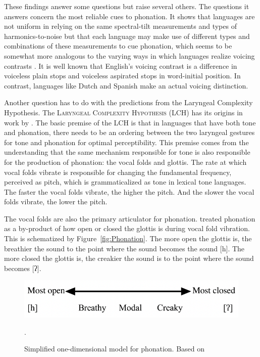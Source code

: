 \documentclass[12pt, letterpaper]{article}
\begin{document}
These findings answer some questions but raise several others. The questions it answers concern the most reliable cues to phonation. It shows that languages are not uniform in relying on the same spectral-tilt measurements and types of harmonics-to-noise but that each language may make use of different types and combinations of these measurements to cue phonation, which seems to be somewhat more analogous to the varying ways in which languages realize voicing contrasts \citep{liskerCrossLanguageStudyVoicing1964}. It is well known that English's voicing contrast is a difference in voiceless plain stops and voiceless aspirated stops in word-initial position. In contrast, languages like Dutch and Spanish make an actual voicing distinction. 

Another question has to do with the predictions from the Laryngeal Complexity Hypothesis. The \textsc{Laryngeal Complexity Hypothesis} (LCH) has its origins in work by \citet{silvermanLaryngealComplexityOtomanguean1997,blankenshipTimeCourseBreathiness1997,blankenshipTimingNonmodalPhonation2002}. The basic premise of the LCH is that in languages that have both tone and phonation, there needs to be an ordering between the two laryngeal gestures for tone and phonation for optimal perceptibility. This premise comes from the understanding that the same mechanism responsible for tone is also responsible for the production of phonation: the vocal folds and glottis. The rate at which vocal folds vibrate is responsible for changing the fundamental frequency, perceived as pitch, which is grammaticalized as tone in lexical tone languages. The faster the vocal folds vibrate, the higher the pitch. And the slower the vocal folds vibrate, the lower the pitch. 

The vocal folds are also the primary articulator for phonation. \citet{ladefogedPreliminariesLinguisticPhonetics1971,gordonPhonationTypesCrosslinguistic2001} treated phonation as a by-product of how open or closed the glottis is during vocal fold vibration. This is schematized by Figure~\ref{fig:Phonation}. The more open the glottis is, the breathier the sound to the point where the sound becomes the sound [h]. The more closed the glottis is, the creakier the sound is to the point where the sound becomes [ʔ]. 

\begin{figure}[!ht]
	\centering
	\includegraphics[width=.6\textwidth]{Phonation.png}
	\caption{Simplified one-dimensional model for phonation. Based on \citet{ladefogedPreliminariesLinguisticPhonetics1971,gordonPhonationTypesCrosslinguistic2001}}.
	\label{fig:Phonation2}
\end{figure}
\end{document}
